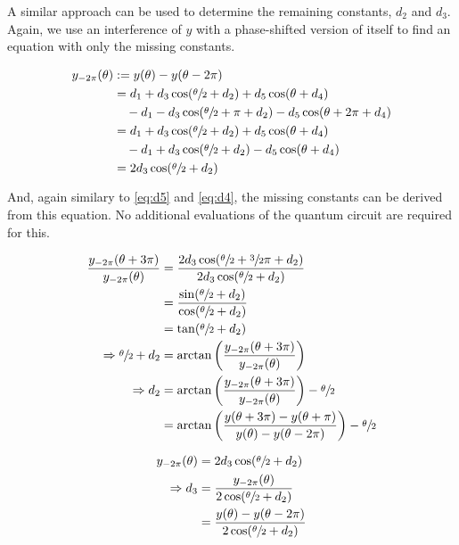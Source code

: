 A similar approach can be used to determine the remaining constants, $d_2$ and
$d_3$.
Again, we use an interference of $y$ with a phase-shifted version of itself to
find an equation with only the missing constants.

\begin{equation}
    \label{eq:y-2pi}
    \begin{split}
        y_{-2\pi}(\theta)
            &:= y(\theta) - y(\theta - 2\pi) \\
            &= d_1 + d_3 \cos(\sfrac\theta2 + d_2) + d_5 \cos(\theta + d_4) \\
                &\quad - d_1 - d_3 \cos(\sfrac\theta2 + \pi + d_2) - d_5 \cos(\theta + 2\pi + d_4) \\
            &= d_1 + d_3 \cos(\sfrac\theta2 + d_2) + d_5 \cos(\theta + d_4) \\
                &\quad - d_1 + d_3 \cos(\sfrac\theta2 + d_2) - d_5 \cos(\theta + d_4) \\
            &= 2 d_3 \cos(\sfrac\theta2 + d_2)
    \end{split}
\end{equation}

And, again similary to \ref{eq:d5} and \ref{eq:d4}, the missing constants can be
derived from this equation.
No additional evaluations of the quantum circuit are required for this.

\begin{equation}
    \label{eq:d2}
    \begin{split}
        \frac{y_{-2\pi}(\theta + 3\pi)}{y_{-2\pi}(\theta)}
            &= \frac{2 d_3 \cos(\sfrac\theta2 + \sfrac32 \pi + d_2)}{2 d_3 \cos(\sfrac\theta2 + d_2)} \\
            &= \frac{\sin(\sfrac\theta2 + d_2)}{\cos(\sfrac\theta2 + d_2)} \\
            &= \tan(\sfrac\theta2 + d_2) \\
        \Rightarrow \sfrac\theta2 + d_2
            &= \arctan\left(\frac{y_{-2\pi}(\theta + 3\pi)}{y_{-2\pi}(\theta)}\right) \\
        \Rightarrow d_2
            &= \arctan\left(\frac{y_{-2\pi}(\theta + 3\pi)}{y_{-2\pi}(\theta)}\right) - \sfrac\theta2 \\
            &= \arctan\left(\frac{y(\theta + 3\pi) - y(\theta + \pi)}{y(\theta) - y(\theta - 2\pi)}\right) - \sfrac\theta2
    \end{split}
\end{equation}

\begin{equation}
    \label{eq:d3}
    \begin{split}
        y_{-2\pi}(\theta)
            &= 2 d_3 \cos(\sfrac\theta2 + d_2) \\
        \Rightarrow d_3
            &= \frac{y_{-2\pi}(\theta)}{2 \cos(\sfrac\theta2 + d_2)} \\
            &= \frac{y(\theta) - y(\theta - 2\pi)}{2 \cos(\sfrac\theta2 + d_2)}
    \end{split}
\end{equation}

